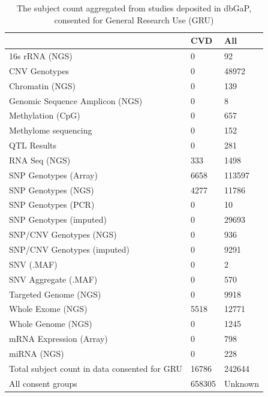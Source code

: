 \documentclass[letter]{bioinfo}
\begin{document}
\begin{table}[]
	\caption{The subject count aggregated from studies deposited in dbGaP, consented for General Research Use (GRU)}
	\label{tab:dbgapSubject}
	\begin{tabular}{l l l}
		\toprule
		& \textbf{CVD} &  \textbf{All}                         \\ \midrule
		16s rRNA (NGS)                 &     0 &      92 \\
		CNV Genotypes                  &     0 &   48972 \\
		Chromatin (NGS)                &     0 &     139 \\
		Genomic Sequence Amplicon (NGS)&     0 &       8 \\
		Methylation (CpG)              &     0 &     657 \\
		Methylome sequencing           &     0 &     152 \\
		QTL Results                    &     0 &     281 \\
		RNA Seq (NGS)                  &   333 &    1498 \\
		SNP Genotypes (Array)          &  6658 &  113597 \\
		SNP Genotypes (NGS)            &  4277 &   11786 \\
		SNP Genotypes (PCR)            &     0 &      10 \\
		SNP Genotypes (imputed)        &     0 &   29693 \\
		SNP/CNV Genotypes (NGS)        &     0 &     936 \\
		SNP/CNV Genotypes (imputed)    &     0 &    9291 \\
		SNV (.MAF)                     &     0 &       2 \\
		SNV Aggregate (.MAF)           &     0 &     570 \\
		Targeted Genome (NGS)          &     0 &    9918 \\
		Whole Exome (NGS)              &  5518 &   12771 \\
		Whole Genome (NGS)             &     0 &    1245 \\
		mRNA Expression (Array)        &     0 &     798 \\
		miRNA (NGS)                        & 0 &   228 \\ \hline
		Total subject count in data consented for GRU & 16786 & 242644 \\ \hline
		All consent groups & 658305 & Unknown \\	
	\end{tabular}
\end{table}
\end{document}
